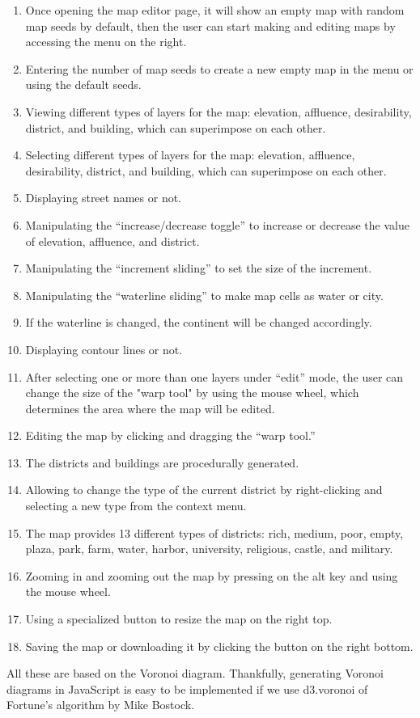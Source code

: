 \begin{enumerate}
  \item Once opening the map editor page, it will show an empty map with random map seeds by default, then the user can start making and editing maps by accessing the menu on the right.
  \item Entering the number of map seeds to create a new empty map in the menu or using the default seeds.
  \item Viewing different types of layers for the map: elevation, affluence, desirability, district, and building, which can superimpose on each other.
  \item Selecting different types of layers for the map: elevation, affluence, desirability, district, and building, which can superimpose on each other.
  \item Displaying street names or not.
  \item Manipulating the ``increase/decrease toggle'' to increase or decrease the value of elevation, affluence, and district.
  \item Manipulating the ``increment sliding'' to set the size of the increment.
  \item Manipulating the ``waterline sliding'' to make map cells as water or city.
  \item If the waterline is changed, the continent will be changed accordingly.
  \item Displaying contour lines or not.
  \item After selecting one or more than one layers under ``edit'' mode, the user can change the size of the "warp tool" by using the mouse wheel, which determines the area where the map will be edited.
  \item Editing the map by clicking and dragging the ``warp tool.''
  \item The districts and buildings are procedurally generated.
  \item Allowing to change the type of the current district by right-clicking and selecting a new type from the context menu.
  \item The map provides 13 different types of districts: rich, medium, poor, empty, plaza, park, farm, water, harbor, university, religious, castle, and military.
  \item Zooming in and zooming out the map by pressing on the alt key and using the mouse wheel.
  \item Using a specialized button to resize the map on the right top.
  \item Saving the map or downloading it by clicking the button on the right bottom.
\end{enumerate}

All these are based on the Voronoi diagram. Thankfully, generating Voronoi diagrams in JavaScript is easy to be implemented if we use d3.voronoi of Fortune’s algorithm by Mike Bostock.
